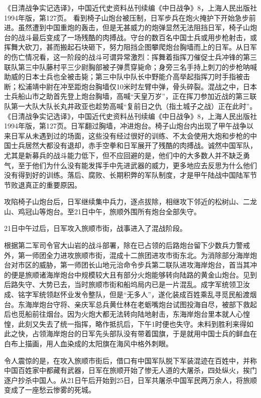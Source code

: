 \documentclass[12pt,UTF8]{ctexbook}
\begin{document}
《日清战争实记选译》，中国近代史资料丛刊续编《中日战争》8，上海人民出版社1994年版，第127页。
看到椅子山炮台被压制，日军步兵在炮火掩护下开始急步前进。虽然遭到中国重炮的轰击，但是无甚威力的炮弹显然无法阻挡日军，椅子山炮台的战斗最后变成了一场残酷的肉搏战。守台的数百名中国士兵或用步枪射击，或挥舞大砍刀，甚而搬起石块砸下，努力阻挡企图攀爬炮台胸墙而上的日军。从日军的伤亡情况看，这一阶段的战斗可谓异常激烈：挥舞着指挥刀催促士兵冲锋的第三联队第三中队藤村平三少尉胸部被子弹贯穿毙命；身旁三名手持上刺刀的步枪呐喊助威的日本士兵也全被击毙；第三中队中队长中野能介高举起指挥刀时手指被击断；松浦靖中尉在冲至距炮台胸墙仅10米时左臂中弹，骨头碎裂。混战之中，日本士兵船山市之助首先登上炮台胸墙，高喊“天皇万岁”，正在挥刀参加近战的第三联队第一大队大队长丸井政亚也趁势高喊“复前日之仇（指土城子之战）正在此时”。 《日清战争实记选译》，中国近代史资料丛刊续编《中日战争》8，上海人民出版社1994年版，第127页。日军翻过胸墙，冲进炮台。椅子山炮台内出现了甲午战争以来日军从未遇到过的场面，这些没有经过很好的训练、不太会使用大炮和步枪的中国士兵居然大都没有退却，赤手空拳和日军展开了残酷的肉搏战。诚然中国军队，尤其是新募兵的战斗能力低下，但不应回避的是，他们中的大多数人并不缺乏勇气，至于他们为什么没有能发挥手中先进武器的威力，更多地应去反思为什么他们没有得到好的训练。落后、腐败、长期积弊的军队制度，才是甲午陆战中国陆军节节败退真正的重要原因。

攻陷椅子山炮台后，日军继续集中兵力，逐点拔除，相继攻下邻近的松树山、二龙山、鸡冠山等炮台。至21日中午，旅顺外围所有炮台全部失守。

21日中午过后，日军攻入旅顺市街，战事进入了混战阶段。

根据第二军司令官大山岩的战斗部署，除在已占领的后路炮台留下少数兵力警戒外，第一师团全力进攻旅顺市街，混成十二旅团进攻市街东北。为消除部分海岸炮台对市区的威胁，第一师团长山地元治命令步兵第二联队进攻海岸炮台，首当其冲的便是旅顺诸海岸炮台中规模较大且有部分火炮能够转向陆路的黄金山炮台。见到后路失守、大势已去，当时旅顺市街和船坞局内已是一片混乱。成字军统领卫汝成、铭字军统领赵怀业发令整队，但是“无多人”，遂化装成百姓乘乱寻觅民船渡烟台。东海岸炮台守将、亲庆军总兵黄仕林在老蛎嘴炮台试图投海自尽，被部下救起后也觅船前往烟台。因为火炮大都无法转向陆地射击，东海岸炮台里本就人心惶惶，此刻又失去了统一指挥，略作抵抗后，下午1时便也失守。未料到胜利来得如此之快，占领海岸炮台的日军先头部队没有带着国旗，于是就用中国士兵的鲜血在白布上描画，用人血染成的太阳旗在海风中格外刺眼。

令人震惊的是，在攻入旅顺市街后，借口有中国军队脱下军装混迹在百姓中，并称中国百姓家中都藏有武器，日军在旅顺开始了惨无人道的大屠杀，四处纵火，挨门逐户抄杀中国人。从21日午后开始到25日，日军共屠杀中国军民两万余人，将旅顺变成了一座愁云惨雾的死城。
\end{document}

